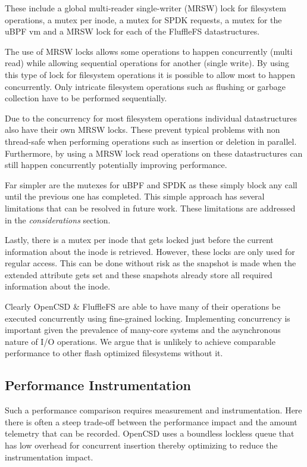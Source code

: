 These include a global multi-reader single-writer (MRSW) lock for filesystem
operations, a mutex per inode, a mutex for SPDK requests, a mutex for the uBPF
vm and a MRSW lock for each of the FluffleFS datastructures.

The use of MRSW locks allows some operations to happen concurrently (multi read)
while allowing sequential operations for another (single write). By using this
type of lock for filesystem operations it is possible to allow most to happen
concurrently. Only intricate filesystem operations such as flushing or garbage
collection have to be performed sequentially.

Due to the concurrency for most filesystem operations individual datastructures
also have their own MRSW locks. These prevent typical problems with non
thread-safe when performing operations such as insertion or deletion in
parallel. Furthermore, by using a MRSW lock read operations on these
datastructures can still happen concurrently potentially improving performance.

Far simpler are the mutexes for uBPF and SPDK as these simply block any call
until the previous one has completed. This simple approach has several
limitations that can be resolved in future work. These limitations are addressed
in the \textit{considerations} section.

Lastly, there is a mutex per inode that gets locked just before the current
information about the inode is retrieved. However, these locks are only used for
regular access. This can be done without risk as the snapshot is made when the
extended attribute gets set and these snapshots already store all required
information about the inode.

Clearly OpenCSD \& FluffleFS are able to have many of their operations be executed
concurrently using fine-grained locking. Implementing concurrency is important
given the prevalence of many-core systems and the asynchronous nature of I/O
operations. We argue that is unlikely to achieve comparable performance to other
flash optimized filesystems without it.

\subsection{Performance Instrumentation}

Such a performance comparison requires measurement and instrumentation. Here
there is often a steep trade-off between the performance impact and the amount
telemetry that can be recorded. OpenCSD uses a boundless lockless
queue \cite{Michael1996SimpleFA} that has low overhead for concurrent insertion
thereby optimizing to reduce the instrumentation impact.

